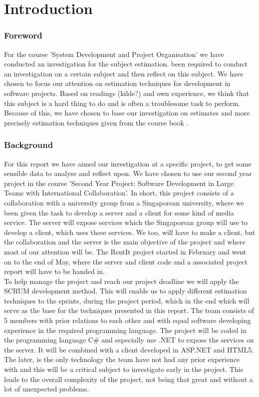\part{Introduction}
\section{Foreword}
For the course 'System Development and Project Organisation' we have conducted an investigation for the subject estimation. been required to conduct an investigation on a certain subject and then reflect on this subject. We have chosen to focus our attention on estimation techniques for development in software projects. Based on readings (kilde?) and own experience, we think that this subject is a hard thing to do and is often a troublesome task to perform. Because of this, we have chosen to base our investigation on estimates and more precisely estimation techniques given from the course book \cite{ProjectManagement_b}. 

\section{Background}
For this report we have aimed our investigation at a specific project, to get some sensible data to analyse and reflect upon. We have chosen to use our second year project in the course 'Second Year Project: Software Development in Large Teams with International Collaboration'. In short, this project consists of a collaboration with a university group from a Singaporean university, where we been given the task to develop a server and a client for some kind of media service. The server will expose services which the Singaporean group will use to develop a client, which uses these services. We too, will have to make a client, but the collaboration and the server is the main objective of the project  and where most of our attention will be. The RentIt project started in February and went on to the end of May, where the server and client code and a associated project report will have to be handed in. \\ 

To help manage the project and reach our project deadline we will apply the SCRUM development method. This will enable us to apply different estimation techniques to the sprints, during the project period, which in the end which will serve as the base for the techniques presented in this report. The team consists of 5 members with prior relations to each other and with equal software developing experience in the required programming language. The project will be coded in the programming language C\# \cite{cSharp_w} and especially use .NET \cite{.NET_w} to expose the services on the server. It will be combined with a client developed in ASP.NET\cite{ASP.NET_w} and HTML5\cite{HTML5_w}. The later, is the only technology the team have not had any prior experience with and this will be a critical subject to investigate early in the project. This leads to the overall complexity of the project, not being that great and without a lot of unexpected problems. 

